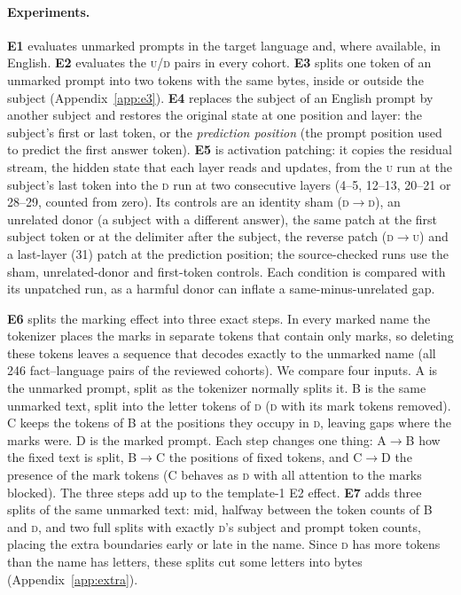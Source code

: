 \documentclass[11pt]{article}
\newcommand{\U}{\textsc{u}}
\newcommand{\D}{\textsc{d}}
\newcommand{\cA}{\textsf{A}}
\newcommand{\cB}{\textsf{B}}
\newcommand{\cC}{\textsf{C}}
\newcommand{\cD}{\textsf{D}}
\begin{document}
\paragraph{Experiments.}
\textbf{E1} evaluates unmarked prompts in the target language and, where
available, in English. \textbf{E2} evaluates the \U/\D{} pairs in every cohort. \textbf{E3} splits one token of an unmarked prompt into
two tokens with the same bytes, inside or outside the subject
(Appendix~\ref{app:e3}). \textbf{E4} replaces the subject of an English prompt by
another subject and restores the original state at one position and layer: the
subject's first or last token, or the \emph{prediction position} (the prompt
position used to predict the first answer token).
\textbf{E5} is activation patching: it copies the residual stream, the hidden
state that each layer reads and updates, from the \U{} run at the subject's last
token into the \D{} run at two consecutive layers (4--5, 12--13, 20--21 or
28--29, counted from zero). Its controls are an identity sham (\D$\to$\D), an unrelated donor (a subject with a different answer), the same patch at the first subject token or at the delimiter after the subject, the reverse
patch (\D$\to$\U) and a last-layer (31) patch at the prediction position; the source-checked runs use the sham, unrelated-donor and
first-token controls. Each condition is compared with its unpatched run, as a harmful donor can inflate a same-minus-unrelated gap.

\textbf{E6} splits the marking effect into three exact steps. In every marked
name the tokenizer places the marks in separate tokens that contain only marks,
so deleting these tokens leaves a sequence that decodes exactly to the unmarked
name (all 246 fact--language pairs of the reviewed cohorts). We compare four
inputs. \cA{} is the unmarked prompt, split as the tokenizer normally splits it.
\cB{} is the same unmarked text, split into the letter tokens of \D{} (\D{}
with its mark tokens removed). \cC{} keeps the tokens of \cB{} at the positions
they occupy in \D{}, leaving gaps where the marks were. \cD{} is the marked
prompt. Each step changes one thing: \cA$\to$\cB{} how the fixed text is split,
\cB$\to$\cC{} the positions of fixed tokens, and \cC$\to$\cD{} the presence of
the mark tokens (\cC{} behaves as \D{} with all attention to the marks blocked). The three steps add up to the template-1 E2 effect. \textbf{E7} adds three splits of the same unmarked text:
\textsf{mid}, halfway between the token counts of \cB{} and \D, and two \textsf{full} splits with exactly \D's subject and prompt token counts,
placing the extra boundaries early or late in the name. Since \D{} has more
tokens than the name has letters, these splits cut some letters into bytes (Appendix~\ref{app:extra}).
\end{document}
